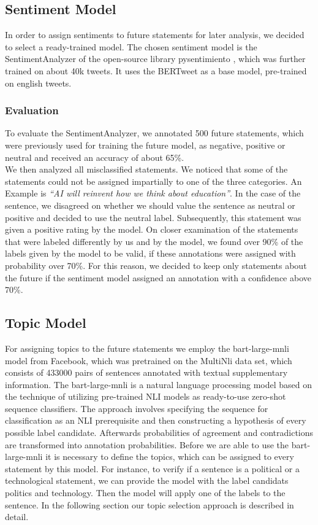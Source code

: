 \subsection{Sentiment Model}
In order to assign sentiments to future statements for later analysis, we decided to select a ready-trained model.
The chosen sentiment model is the SentimentAnalyzer of the open-source library pysentimiento \citep{perez2021pysentimiento}, which was further trained on about 40k tweets.
It uses the BERTweet \citep{bertweet} as a base model, pre-trained on english tweets.

\subsubsection{Evaluation}
To evaluate the SentimentAnalyzer, we annotated 500 future statements, which were previously used for training the future model, as negative, positive or neutral and received an accuracy of about 65\%.
\\
We then analyzed all misclassified statements.
We noticed that some of the statements could not be assigned impartially to one of the three categories.
An Example is \emph{``AI will reinvent how we think about education''}.
In the case of the sentence, we disagreed on whether we should value the sentence as neutral or positive and decided to use the neutral label.
Subsequently, this statement was given a positive rating by the model.
On closer examination of the statements that were labeled differently by us and by the model, we found over 90\% of the labels given by the model to be valid, if these annotations were assigned with probability over 70\%.
For this reason, we decided to keep only statements about the future if the sentiment model assigned an annotation with a confidence above 70\%.

\subsection{Topic Model}
\label{topic-model}
For assigning topics to the future statements we employ the bart-large-mnli model from Facebook, which was pretrained on the MultiNli \citep{N18-1101} data set, which consists of 433000 pairs of sentences annotated with textual supplementary information. The bart-large-mnli is a natural language processing model based on the technique of \citet{yin2019benchmarking} utilizing pre-trained NLI models as ready-to-use zero-shot sequence classifiers.
The approach involves specifying the sequence for classification as an NLI prerequisite and then constructing a hypothesis of every possible label candidate.
Afterwards probabilities of agreement and contradictions are transformed into annotation probabilities.
Before we are able to use the bart-large-mnli it is necessary to define the topics, which can be assigned to every statement by this model.
For instance, to verify if a sentence is a political or a technological statement, we can provide the model with the label candidats politics and technology. Then the model will apply one of the labels to the sentence.
In the following section our topic selection approach is described in detail.

